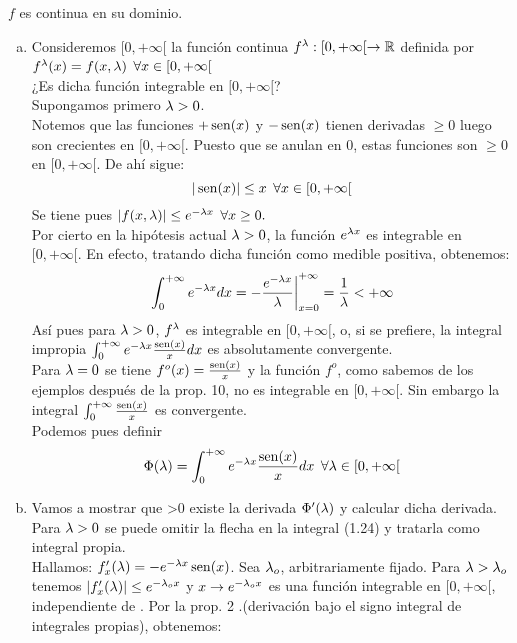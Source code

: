 $f$ es continua en su dominio. \\
\begin{enumerate}[a)]
\item Consideremos \todo \lam \en $[0,+\infty[$ la función continua $f^{\lambda} :[0,+\infty[ \rightarrow \mathbb{R}$ definida por $f^{\lambda} (x)=f(x,\lambda)$ $\forall x \in [0,+\infty[$ \\
¿Es dicha función integrable en $[0,+\infty[$?\\
Supongamos primero $\lambda>0$.\\
Notemos que las funciones \x \flecha \x$+\operatorname{sen} (x)$ y \x \flecha \x$-\operatorname{sen} (x)$ tienen derivadas $\geq 0$ luego son crecientes en $[0,+\infty[$. Puesto que se anulan en 0, estas funciones son $\geq 0$ en $[0,+\infty[$. De ahí sigue:\\
$$
| \operatorname{sen} (x) | \leq x \phantom{s} \forall x \in [0,+\infty[
$$
Se tiene pues $|f(x,\lambda) | \leq e^{-\lambda x} \phantom{s} \forall x \geq 0.$\\
Por cierto en la hipótesis actual $\lambda>0$, la función \x \flecha $e^{\lambda x}$ es integrable en $[0,+\infty[$. En efecto, tratando dicha función como medible positiva, obtenemos:
\begin{equation*}
\left. 
\int_0^{+\infty}e^{-\lambda x}dx=-\frac{e^{-\lambda x}}{\lambda}\right|_{x=0}^{+\infty}=\frac{1}{\lambda}<+\infty
\end{equation*}
Así pues para $\lambda>0$, $f^{\lambda}$ es integrable en $[0,+\infty[$, o, si se prefiere, la integral impropia $\int_0^{+\infty}e^{-\lambda x}\frac{\operatorname{sen} (x)}{x}dx$ es absolutamente convergente.\\
Para $\lambda=0$ se tiene $f^o(x)=\frac{\operatorname{sen} (x)}{x}$ y la función $f^o$, como sabemos de los ejemplos después de la prop. 10, no es integrable en $[0,+\infty[$. Sin embargo la integral $\int_0^{+\infty}\frac{\operatorname{sen} (x)}{x}$ es convergente.\\
Podemos pues definir
\begin{equation}
\Phi (\lambda)=\int_0^{+\infty}e^{-\lambda x}\frac{\operatorname{sen} (x)}{x}dx \phantom{s} \forall \lambda \in [0,+\infty[
\end{equation}
\item Vamos a mostrar que \todo \lam >0 existe la derivada $\Phi ' (\lambda)$ y calcular dicha derivada. Para $\lambda >0$ se puede omitir la flecha en la integral (1.24) y tratarla como integral propia.\\
Hallamos: $f_x' (\lambda)=-e^{-\lambda x}\operatorname{sen} (x)$.
Sea $\lambda_o$, arbitrariamente fijado. Para $\lambda>\lambda_o$ tenemos $|f_x ' (\lambda) | \leq e^{-\lambda_o x}$ y $x \rightarrow e^{-\lambda_o x}$ es una función integrable en $[0,+\infty[$, independiente de \lam . Por la prop. 2 .(derivación bajo el signo integral de integrales propias), obtenemos:

\end{enumerate}
